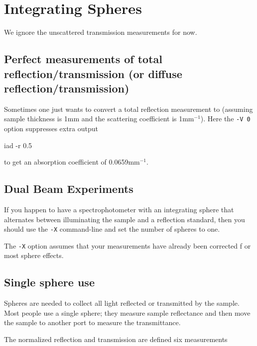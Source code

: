 
\chapter{Integrating Spheres}

We ignore the unscattered transmission measurements for now.

\section{Perfect measurements of total reflection/transmission (or diffuse reflection/transmission)}

Sometimes one just wants to convert a total reflection measurement to (assuming sample thickness
is 1mm and the scattering coefficient is 1mm$^{-1}$).  Here the \texttt{-V 0} option suppresses 
extra output

\begin{grayverb}
iad -r 0.5
\end{grayverb}

to get an absorption coefficient of 0.0659mm$^{-1}$.


\section{Dual Beam Experiments}
If you happen to have a spectrophotometer with an integrating sphere that 
alternates between illuminating the sample and a reflection standard, then 
you should use the \texttt{-X} command-line and set the number of spheres to one.  

The \texttt{-X} option assumes that your measurements have already been corrected f
or most sphere effects.  

\section{Single sphere use}
Spheres are needed to collect all light reflected or transmitted by the sample.  Most
people use a single sphere; they measure sample reflectance and then move the sample
to another port to measure the transmittance.

The normalized reflection and transmission are defined six measurements 

